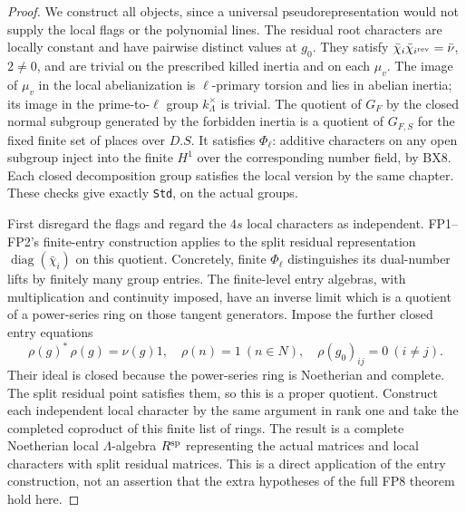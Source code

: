 \begin{proof}
We construct all objects, since a universal pseudorepresentation
would not supply the local flags or the polynomial lines.
The residual root characters are locally constant and
have pairwise distinct values at $g_0$.  They satisfy
$\bar\chi_i\bar\chi_{i^{\rm rev}}=\bar\nu$,
$2\ne0$, and are trivial on the prescribed killed
inertia and on each $\mu_v$.  The image of $\mu_v$
in the local abelianization is $\ell$-primary torsion
and lies in abelian inertia; its image in the prime-to-$\ell$ group
$k_\Lambda^\times$ is trivial.
The quotient of $G_F$ by the closed normal subgroup
generated by the forbidden inertia is a quotient of
$G_{F,S}$ for the fixed finite set of places over
$D.S$.  It satisfies $\Phi_\ell$: additive characters
on any open subgroup inject into the finite $H^1$
over the corresponding number field, by BX8.
Each closed decomposition group satisfies the local
version by the same chapter.  These checks give
exactly \texttt{Std}, on the actual groups.

First disregard the flags and regard the $4s$ local
characters as independent.  FP1--FP2's finite-entry
construction applies to the split residual representation
$\operatorname{diag}(\bar\chi_i)$ on this quotient.
Concretely, finite $\Phi_\ell$ distinguishes its
dual-number lifts by finitely many group entries.
The finite-level entry algebras, with multiplication
and continuity imposed, have an inverse limit which
is a quotient of a power-series ring on those
tangent generators.  Impose the further closed
entry equations
\[
 \rho(g)^*\,\rho(g)=\nu(g)1,\quad
 \rho(n)=1\ (n\in N),\quad
 \rho(g_0)_{ij}=0\ (i\ne j).
 \tag{UX.32}
\]
Their ideal is closed because the power-series ring
is Noetherian and complete.  The split residual
point satisfies them, so this is a proper quotient.
Construct each independent local character by the
same argument in rank one and take the completed
coproduct of this finite list of rings.  The result
is a complete Noetherian local $\Lambda$-algebra
$R^{\rm sp}$ representing the actual matrices and
local characters with split residual matrices.
This is a direct application of the entry construction,
not an assertion that the extra hypotheses of
the full FP8 theorem hold here.


\end{proof}
